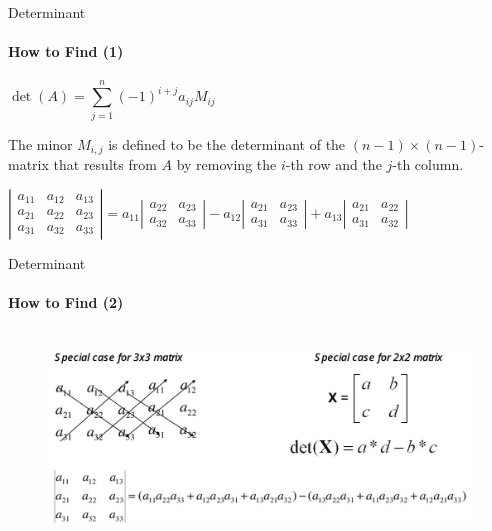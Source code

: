 \documentclass[aspectratio=169,notes]{beamer}
\begin{document}
\begin{frame}[t]{Determinant}
\framesubtitle{How to Find (1)}
\vspace{-0.8cm}
\begin{equation*}
    \det(A)=\sum _{j=1}^{n}(-1)^{i+j}a_{ij}M_{ij}
    \phantom{\hspace{20cm}}
\end{equation*} \smallskip

The minor $M_{i,j}$ is defined to be the determinant of the $(n-1)\times (n-1)$-matrix that results from $A$ by removing the $i$-th row and the $j$-th column. \smallskip

\begin{equation*}
    \left\lvert \begin{matrix}
        a_{11} & a_{12} & a_{13} \\
        a_{21} & a_{22} & a_{23} \\ 
        a_{31} &  a_{32} & a_{33} 
        \end{matrix}\right\rvert = a_{11}\left\lvert \begin{matrix}
            a_{22} & a_{23} \\ 
            a_{32} & a_{33} 
        \end{matrix} \right\rvert  - a_{12}\left\lvert \begin{matrix}
            a_{21} & a_{23}\\ 
            a_{31}&  a_{33}
        \end{matrix} \right\rvert  + a_{13}\left\lvert \begin{matrix}
            a_{21} & a_{22} \\ 
            a_{31} &  a_{32}  
        \end{matrix} \right\rvert \phantom{\hspace{8cm}}
\end{equation*}
\end{frame}

\begin{frame}[t]{Determinant}
\framesubtitle{How to Find (2)}
\vspace{-0.5cm}
\begin{figure}[H]
    \centering\includegraphics[height=5.5cm,width=1\textwidth,keepaspectratio]{detdet.png}
    \label{fig:detdet.png}
\end{figure}
\end{frame}
\end{document}
